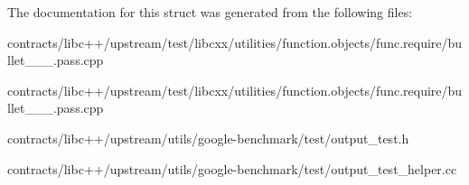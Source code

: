 The documentation for this struct was generated from the following files\+:\begin{DoxyCompactItemize}
\item 
contracts/libc++/upstream/test/libcxx/utilities/function.\+objects/func.\+require/bullet\+\_\+\_\+\_.\+pass.\+cpp\item 
contracts/libc++/upstream/test/libcxx/utilities/function.\+objects/func.\+require/bullet\+\_\+\_\+\_.\+pass.\+cpp\item 
contracts/libc++/upstream/utils/google-\/benchmark/test/output\+\_\+test.\+h\item 
contracts/libc++/upstream/utils/google-\/benchmark/test/output\+\_\+test\+\_\+helper.\+cc\end{DoxyCompactItemize}
